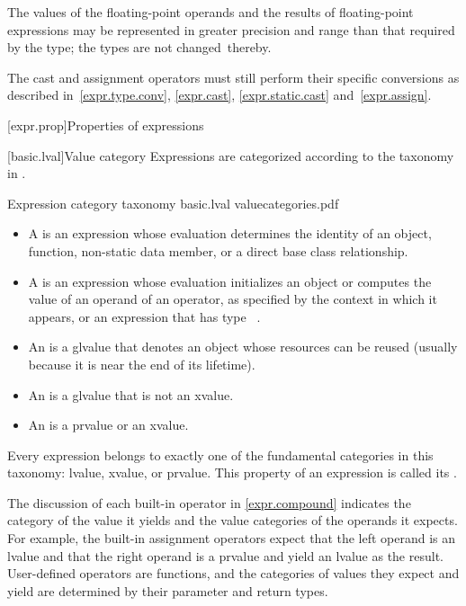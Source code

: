 \pnum
The values of the floating-point operands and
the results of floating-point expressions
may be represented in greater precision and range than that
required by the type; the types are not changed\
thereby.
\begin{footnote}
The cast and assignment operators must still perform their specific
conversions as described in~\ref{expr.type.conv}, \ref{expr.cast},
\ref{expr.static.cast} and~\ref{expr.assign}.
\end{footnote}

[expr.prop]{Properties of expressions}

[basic.lval]{Value category}
\pnum
Expressions are categorized according to the taxonomy in .

\begin{importgraphic}
{Expression category taxonomy}
{basic.lval}
{valuecategories.pdf}
\end{importgraphic}

\begin{itemize}
\item A  is an expression
whose evaluation determines the identity of
an object, function, non-static data member, or
a direct base class relationship.
\item A  is an expression whose evaluation initializes an object
or computes the value of an operand of an operator,
as specified by the context in which it appears,
or an expression that has type \cv{}~.
\item An  is a glvalue that denotes an object whose resources can be reused (usually because it is near the end of its lifetime).
\item An \defn{lvalue} is a glvalue that is not an xvalue.
\item An  is a prvalue or an xvalue.
\end{itemize}

\pnum
Every expression belongs to exactly one of the fundamental categories in this
taxonomy: lvalue, xvalue, or prvalue. This property of an expression is called
its \defn{value category}.
\begin{note}
The discussion of each built-in operator in
\ref{expr.compound} indicates the category of the value it yields and the value categories
of the operands it expects. For example, the built-in assignment operators expect that
the left operand is an lvalue and that the right operand is a prvalue and yield an
lvalue as the result. User-defined operators are functions, and the categories of
values they expect and yield are determined by their parameter and return types.
\end{note}

